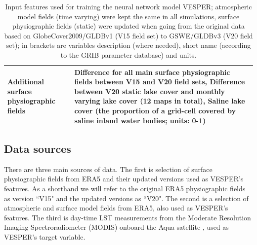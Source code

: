 \documentclass[hess, twostagejnl]{copernicus}
\begin{document}
\begin{table}
\begin{tabularx}{\textwidth}{lX}
		\\
		Additional surface physiographic fields               & Difference for all main surface physiographic fields between V15 and V20 field sets, \newline 
		Difference between V20 static lake cover and monthly varying lake cover (12 maps in total),\newline 
		Saline lake cover (the proportion of a grid-cell covered by saline inland water bodies; units: 0-1)
		 \\
		\hline
	\end{tabularx}
\caption{Input features used for training the neural network model VESPER; atmospheric model fields (time varying) were kept the same in all simulations,  surface  physiographic  fields  (static)  were  updated  when  going  from  the  original  data  based  on GlobeCover2009/GLDBv1 (V15 field set) to GSWE/GLDBv3 (V20 field set); in brackets are variables description (where needed), short name (according to the GRIB parameter database) and units.
}
\label{table:definitions}
\end{table}

\subsection{Data sources }

There are three main sources of data. The first is selection of surface physiographic fields from ERA5 \citep{Hersbach} and their updated versions \citep{Choulga2019,Boussetta2021,Mu2021} used as VESPER’s features. As a shorthand we will refer to the original ERA5 physiographic fields as version ``V15" and the updated versions as ``V20". The second is a selection of atmospheric and surface model fields from ERA5, also used as VESPER’s features. The third is day-time LST measurements from the Moderate Resolution Imaging Spectroradiometer (MODIS) onboard the Aqua satellite \citep{MODIS}, used as VESPER’s target variable. 
\end{document}
